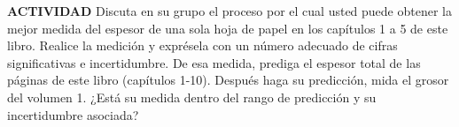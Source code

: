 \item \textbf{ACTIVIDAD} Discuta en su grupo el proceso por el cual usted puede obtener la mejor medida del espesor de una sola hoja de papel en los capítulos 1 a 5 de este libro. Realice la medición y exprésela con un número adecuado de cifras significativas e incertidumbre. De esa medida, prediga el espesor total de las páginas de este libro (capítulos 1-10). Después haga su predicción, mida el grosor del volumen 1. ¿Está su medida dentro del rango de predicción y su incertidumbre asociada?
